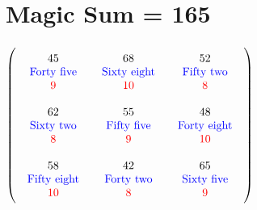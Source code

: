 \documentclass{article}
\begin{document}
\vspace{2em} 
\section{Magic Sum = 165}$ \left( \begin{array}{ccc}
\begin{array}{c}
\rule{0pt}{1.5em}45 \\ 
\text{\color{blue}Forty five} \\ 
\color{red}9 \vspace{.5em} 
\end{array} & \begin{array}{c}
\rule{0pt}{1.5em}68 \\ 
\text{\color{blue}Sixty eight} \\ 
\color{red}10 \vspace{.5em} 
\end{array} & \begin{array}{c}
\rule{0pt}{1.5em}52 \\ 
\text{\color{blue}Fifty two} \\ 
\color{red}8 \vspace{.5em} 
\end{array}\\ 
\begin{array}{c}
\rule{0pt}{1.5em}62 \\ 
\text{\color{blue}Sixty two} \\ 
\color{red}8 \vspace{.5em} 
\end{array} & \begin{array}{c}
\rule{0pt}{1.5em}55 \\ 
\text{\color{blue}Fifty five} \\ 
\color{red}9 \vspace{.5em} 
\end{array} & \begin{array}{c}
\rule{0pt}{1.5em}48 \\ 
\text{\color{blue}Forty eight} \\ 
\color{red}10 \vspace{.5em} 
\end{array}\\ 
\begin{array}{c}
\rule{0pt}{1.5em}58 \\ 
\text{\color{blue}Fifty eight} \\ 
\color{red}10 \vspace{.5em} 
\end{array} & \begin{array}{c}
\rule{0pt}{1.5em}42 \\ 
\text{\color{blue}Forty two} \\ 
\color{red}8 \vspace{.5em} 
\end{array} & \begin{array}{c}
\rule{0pt}{1.5em}65 \\ 
\text{\color{blue}Sixty five} \\ 
\color{red}9 \vspace{.5em} 
\end{array}\end{array} \right) $
\end{document}
